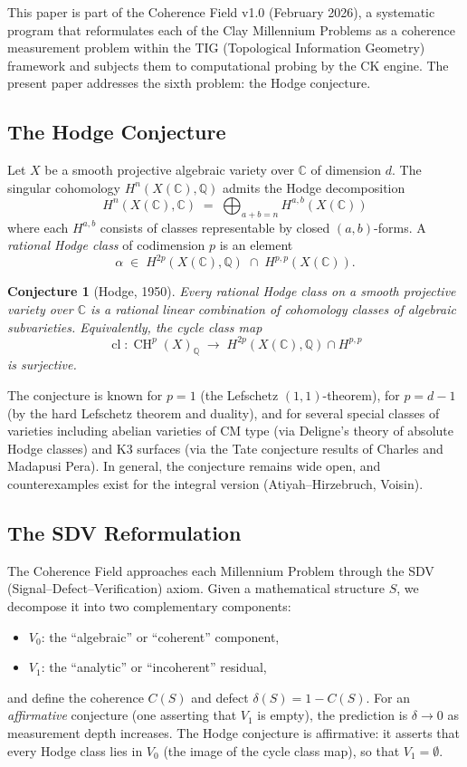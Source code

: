 \documentclass[11pt]{article}
\newtheorem{conjecture}[theorem]{Conjecture}
\theoremstyle{definition}
\DeclareMathOperator{\cl}{cl}
\DeclareMathOperator{\CH}{CH}
\begin{document}
This paper is part of the Coherence Field v1.0 (February 2026),
a systematic program that reformulates each of the Clay Millennium Problems
as a coherence measurement problem within the TIG (Topological Information
Geometry) framework and subjects them to computational probing by the CK
engine.  The present paper addresses the sixth problem: the Hodge conjecture.

\subsection{The Hodge Conjecture}

Let $X$ be a smooth projective algebraic variety over $\mathbb{C}$ of
dimension $d$.  The singular cohomology $H^n(X(\mathbb{C}), \mathbb{Q})$
admits the Hodge decomposition
\[
  H^n(X(\mathbb{C}), \mathbb{C})
  \;=\;
  \bigoplus_{a+b=n} H^{a,b}(X(\mathbb{C}))
\]
where each $H^{a,b}$ consists of classes representable by closed
$(a,b)$-forms.  A \emph{rational Hodge class} of codimension $p$ is an
element
\[
  \alpha \;\in\; H^{2p}(X(\mathbb{C}), \mathbb{Q}) \;\cap\; H^{p,p}(X(\mathbb{C})).
\]

\begin{conjecture}[Hodge, 1950]
Every rational Hodge class on a smooth projective variety over $\mathbb{C}$
is a rational linear combination of cohomology classes of algebraic
subvarieties.  Equivalently, the cycle class map
\[
  \cl : \CH^p(X)_{\mathbb{Q}} \;\longrightarrow\; H^{2p}(X(\mathbb{C}), \mathbb{Q}) \cap H^{p,p}
\]
is surjective.
\end{conjecture}

The conjecture is known for $p = 1$ (the Lefschetz $(1,1)$-theorem), for
$p = d - 1$ (by the hard Lefschetz theorem and duality), and for several
special classes of varieties including abelian varieties of CM type (via
Deligne's theory of absolute Hodge classes) and K3 surfaces (via the Tate
conjecture results of Charles and Madapusi Pera).  In general, the conjecture
remains wide open, and counterexamples exist for the integral version
(Atiyah--Hirzebruch, Voisin).

\subsection{The SDV Reformulation}

The Coherence Field approaches each Millennium Problem through
the SDV (Signal--Defect--Verification) axiom.  Given a mathematical
structure $S$, we decompose it into two complementary components:
\begin{itemize}
  \item $V_0$: the ``algebraic'' or ``coherent'' component,
  \item $V_1$: the ``analytic'' or ``incoherent'' residual,
\end{itemize}
and define the coherence $C(S)$ and defect $\delta(S) = 1 - C(S)$.  For an
\emph{affirmative} conjecture (one asserting that $V_1$ is empty), the
prediction is $\delta \to 0$ as measurement depth increases.  The Hodge
conjecture is affirmative: it asserts that every Hodge class lies in $V_0$
(the image of the cycle class map), so that $V_1 = \emptyset$.
\end{document}
